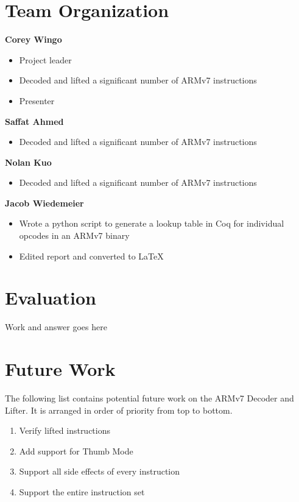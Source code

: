 \documentclass[twocolumn]{article}
\begin{document}
\newpage
\section*{\centering Team Organization}
\vspace{0.3cm}

\textbf{Corey Wingo}
\begin{itemize}
	\item Project leader
	\item Decoded and lifted a significant number of ARMv7 instructions
	\item Presenter\\
\end{itemize}


\textbf{Saffat Ahmed}
\begin{itemize}
	\item Decoded and lifted a significant number of ARMv7 instructions\\
\end{itemize}

\textbf{Nolan Kuo}
\begin{itemize}
	\item Decoded and lifted a significant number of ARMv7 instructions\\
\end{itemize}

\textbf{Jacob Wiedemeier}
\begin{itemize}
	\item Wrote a python script to generate a lookup table in Coq for individual opcodes in an ARMv7 binary
	\item Edited report and converted to LaTeX\\
\end{itemize}

\section*{\centering Evaluation}
\vspace{0.3cm}
Work and answer goes here

\section*{\centering Future Work}
\vspace{0.3cm}

The following list contains potential future work on the ARMv7 Decoder and Lifter. It is arranged in order of priority from top to bottom.\\
\begin{enumerate}
	\item Verify lifted instructions
	\item Add support for Thumb Mode
	\item Support all side effects of every instruction
	\item Support the entire instruction set\\
\end{enumerate}
\end{document}
